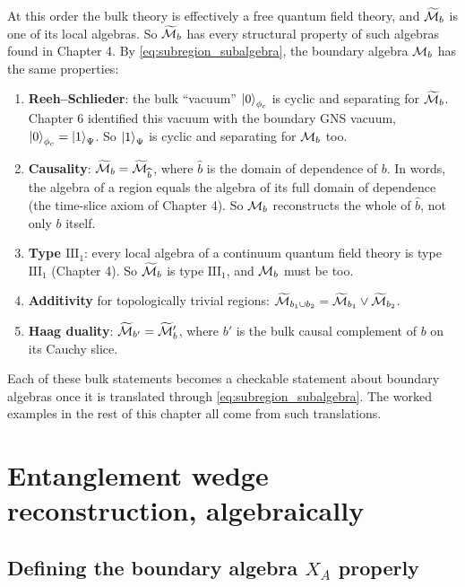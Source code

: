 At this order the bulk theory is effectively a free quantum field theory, and $\widetilde{\mathcal{M}}_b$ is one of its
local algebras. So $\widetilde{\mathcal{M}}_b$ has every structural property of such algebras found in Chapter 4. By
\eqref{eq:subregion_subalgebra}, the boundary algebra $\mathcal{M}_b$ has the same properties:
\begin{enumerate}
\item \textbf{Reeh--Schlieder}: the bulk ``vacuum'' $\ket0_{\phi_c}$ is cyclic and separating for
$\widetilde{\mathcal{M}}_b$. Chapter 6 identified this vacuum with the boundary GNS vacuum, $\ket0_{\phi_c}=\ket1_\Psi$.
So $\ket1_\Psi$ is cyclic and separating for $\mathcal{M}_b$ too.
\item \textbf{Causality}: $\widetilde{\mathcal{M}}_b=\widetilde{\mathcal{M}}_{\widehat b}$, where $\widehat b$ is the domain of
dependence of $b$. In words, the algebra of a region equals the algebra of its full domain of dependence
(the time-slice axiom of Chapter 4). So $\mathcal{M}_b$ reconstructs the whole of $\widehat b$, not only $b$ itself.
\item \textbf{Type $\mathrm{III}_1$}: every local algebra of a continuum quantum field theory is type
$\mathrm{III}_1$ (Chapter 4). So $\widetilde{\mathcal{M}}_b$ is type $\mathrm{III}_1$, and $\mathcal{M}_b$ must be too.
\item \textbf{Additivity} for topologically trivial regions: $\widetilde{\mathcal{M}}_{b_1\cup b_2}=\widetilde{\mathcal{M}}_{b_1}
\vee\widetilde{\mathcal{M}}_{b_2}$.
\item \textbf{Haag duality}: $\widetilde{\mathcal{M}}_{b'}=\widetilde{\mathcal{M}}_b'$, where $b'$ is the bulk causal complement of
$b$ on its Cauchy slice.
\end{enumerate}
Each of these bulk statements becomes a checkable statement about boundary algebras once it is translated
through \eqref{eq:subregion_subalgebra}. The worked examples in the rest of this chapter all come from such
translations.

\section{Entanglement wedge reconstruction, algebraically}

\subsection*{Defining the boundary algebra $X_A$ properly}

